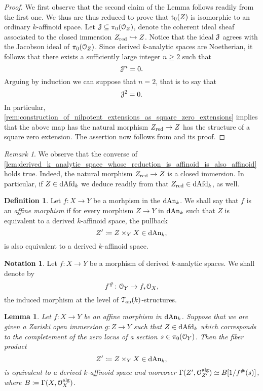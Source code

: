 \documentclass[10pt,a4paper,reqno]{amsart} %
\theoremstyle{plain}
\newtheorem{lem}[thm]{Lemma}
\theoremstyle{definition}
\newtheorem{defin}[thm]{Definition}
\newtheorem{notation}[thm]{Notation}
\theoremstyle{remark}
\newtheorem{rem}[thm]{Remark}
\numberwithin{equation}{section}
\begin{document}
\begin{proof} We first observe that the second claim of the Lemma follows readily from the first one. We thus are thus reduced to prove that $\mathrm{t}_0(Z)$ is isomorphic to an ordinary $k$-affinoid space.
    Let $\mathcal J \subseteq \pi_0(\mathcal O_Z)$, denote the coherent ideal sheaf associated to the closed immersion $Z_{\mathrm{red}} \hookrightarrow Z$. Notice that the ideal $\mathcal J$
    agrees with the Jacobson ideal of $\pi_0(\mathcal O_Z)$. Since derived $k$-analytic spaces are Noetherian, it follows that there exists
    a sufficiently large integer $n \ge 2$ such that
        \[
            \mathcal J^n = 0.  
        \]
    Arguing by induction we can suppose that $n = 2$, that is to say that
        \[\mathcal J^2 = 0.\]
    In particular, \cref{rem:construction_of_nilpotent_extensions_as_square_zero_extensions} implies that the above map has
    the natural morphism $Z_{\mathrm{red}} \to Z$ has the structure of a square zero extension.
    The assertion now follows from \cite[Proposition 6.1]{Porta_Yu_Representability}
    and its proof.
\end{proof}

\begin{rem}
    We observe that the converse of \cref{lem:derived_k_analytic_space_whose_reduction_is_affinoid_is_also_affinoid} holds true.
    Indeed, the natural morphism $Z_{\mathrm{red}} \to Z$ is a closed immersion. In particular, if $Z \in \mathrm{dAfd}_k$ we deduce readily from
    that $Z_{\mathrm{red}} \in \mathrm{dAfd}_k$, as well.
\end{rem}

\begin{defin}
    Let $f \colon X \to Y$ be a morhpism in the \infcat $\mathrm{dAn}_k$. We shall say that $f$ is an \emph{affine morphism} if
    for every morphism $Z \to Y$ in $\mathrm{dAn}_k$ such that $Z$ is equivalent to a derived $k$-affinoid space, the pullback
        \[
            Z' \coloneqq Z \times_Y X \in \mathrm{dAn}_k,  
        \]
    is also equivalent to a derived $k$-affinoid space.
\end{defin}

\begin{notation}
    Let $f \colon X \to Y$ be a morphism of derived $k$-analytic spaces. We shall denote by
        \[
            f^\# \colon \mathcal O_Y \to f_* \mathcal O_X,
        \]  
    the induced morphism at the level of $\mathcal T_{\mathrm{an}}(k)$-structures.
\end{notation}

\begin{lem}
    Let $f \colon X \to Y$ be an affine morphism in $\mathrm{dAn}_k$. Suppose that we are given a Zariski open immersion
    $g \colon Z \to Y$ such that $Z \in \mathrm{dAfd}_k$ which corresponds to the completement of the zero locus of a
    section $s \in \pi_0(\mathcal O_Y)$. Then the fiber product
        \[
            Z' \coloneqq Z \times_Y X \in \mathrm{dAn}_k,  
        \]
    is equivalent to a derived $k$-affinoid space and moreover $\Gamma(Z', \mathcal O_{Z'}^\mathrm{alg}) \simeq B[1/f^\#(s)]$, where
    $B \coloneqq \Gamma(X, \mathcal O_X^\mathrm{alg})$.
\end{lem}
\end{document}
